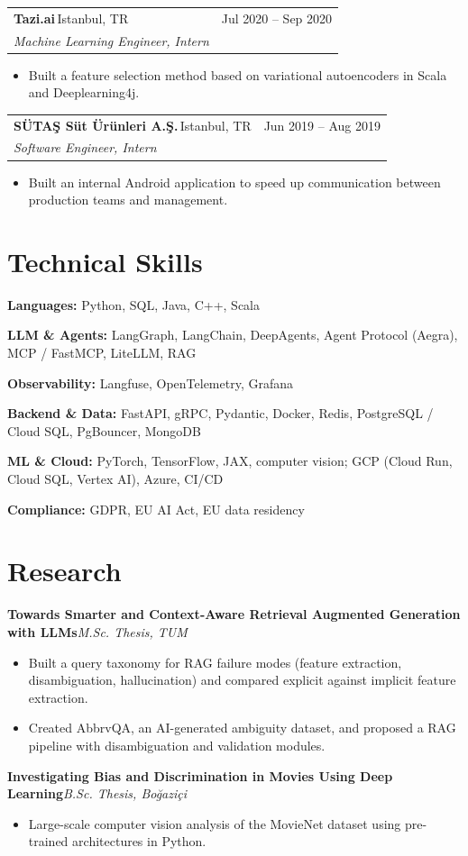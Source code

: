 \documentclass[a4paper,10pt]{article}
\makeatletter
\newcommand{\role}[4]{%
  \vspace{0.25em}%
  \noindent\begin{tabularx}{\linewidth}{@{}X r@{}}
    \textbf{#1}\,\textcolor{muted}{\small #2} & \textcolor{muted}{\small #4}\\[0.05em]
    \textit{#3} & \\
  \end{tabularx}%
  \vspace{-0.15em}%
}
\newcommand{\project}[2]{%
  \vspace{0.25em}%
  \noindent\textbf{#1}\;\textcolor{muted}{\small\textit{#2}}%
  \vspace{-0.05em}%
}
\newcommand{\skill}[2]{\noindent\textbf{\small #1:}\; {\small #2}\par\vspace{0.18em}}
\makeatother
\begin{document}
\role{Tazi.ai}{Istanbul, TR}{Machine Learning Engineer, Intern}{Jul 2020 -- Sep 2020}
\begin{itemize}
  \item Built a feature selection method based on variational autoencoders in Scala and
        Deeplearning4j.
\end{itemize}

\role{SÜTAŞ Süt Ürünleri A.Ş.}{Istanbul, TR}{Software Engineer, Intern}{Jun 2019 -- Aug 2019}
\begin{itemize}
  \item Built an internal Android application to speed up communication between production teams
        and management.
\end{itemize}

\section{Technical Skills}
\skill{Languages}{Python, SQL, Java, C++, Scala}
\skill{LLM \& Agents}{LangGraph, LangChain, DeepAgents, Agent Protocol (Aegra), MCP / FastMCP, LiteLLM, RAG}
\skill{Observability}{Langfuse, OpenTelemetry, Grafana}
\skill{Backend \& Data}{FastAPI, gRPC, Pydantic, Docker, Redis, PostgreSQL / Cloud SQL, PgBouncer, MongoDB}
\skill{ML \& Cloud}{PyTorch, TensorFlow, JAX, computer vision; GCP (Cloud Run, Cloud SQL, Vertex AI), Azure, CI/CD}
\skill{Compliance}{GDPR, EU AI Act, EU data residency}

\section{Research}

\project{Towards Smarter and Context-Aware Retrieval Augmented Generation with LLMs}{M.Sc. Thesis, TUM}
\begin{itemize}
  \item Built a query taxonomy for RAG failure modes (feature extraction, disambiguation,
        hallucination) and compared explicit against implicit feature extraction.
  \item Created AbbrvQA, an AI-generated ambiguity dataset, and proposed a RAG pipeline with
        disambiguation and validation modules.
\end{itemize}

\project{Investigating Bias and Discrimination in Movies Using Deep Learning}{B.Sc. Thesis, Boğaziçi}
\begin{itemize}
  \item Large-scale computer vision analysis of the MovieNet dataset using pre-trained
        architectures in Python.
\end{itemize}
\end{document}
